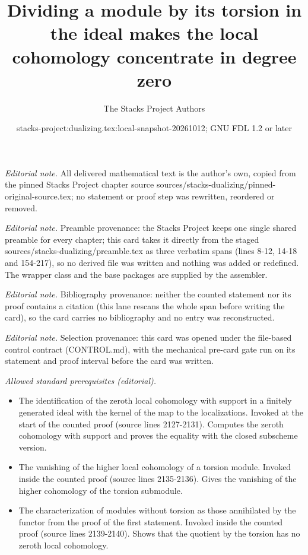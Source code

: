 \documentclass[10pt,a4paper]{amsart}
\title{Dividing a module by its torsion in the ideal makes the local cohomology concentrate in degree zero}
\author{The Stacks Project Authors}
\date{stacks-project:dualizing.tex:local-snapshot-20261012; GNU FDL 1.2 or later}
\theoremstyle{plain}
\theoremstyle{definition}
\theoremstyle{remark}
\numberwithin{equation}{subsection}
\begin{document}
\maketitle
\noindent\textit{Editorial note.} All delivered mathematical text is the author's own, copied from the pinned Stacks Project chapter source sources/stacks-dualizing/pinned-original-source.tex; no statement or proof step was rewritten, reordered or removed.\par\medskip
\noindent\textit{Editorial note.} Preamble provenance: the Stacks Project keeps one single shared preamble for every chapter; this card takes it directly from the staged sources/stacks-dualizing/preamble.tex as three verbatim spans (lines 8-12, 14-18 and 154-217), so no derived file was written and nothing was added or redefined. The wrapper class and the base packages are supplied by the assembler.\par\medskip
\noindent\textit{Editorial note.} Bibliography provenance: neither the counted statement nor its proof contains a citation (this lane rescans the whole span before writing the card), so the card carries no bibliography and no entry was reconstructed.\par\medskip
\noindent\textit{Editorial note.} Selection provenance: this card was opened under the file-based control contract (CONTROL.md), with the mechanical pre-card gate run on its statement and proof interval before the card was written.\par\medskip
\noindent\textit{Allowed standard prerequisites (editorial).}\begin{itemize}
\item The identification of the zeroth local cohomology with support in a finitely generated ideal with the kernel of the map to the localizations. Invoked at the start of the counted proof (source lines 2127-2131). Computes the zeroth cohomology with support and proves the equality with the closed subscheme version.
\item The vanishing of the higher local cohomology of a torsion module. Invoked inside the counted proof (source lines 2135-2136). Gives the vanishing of the higher cohomology of the torsion submodule.
\item The characterization of modules without torsion as those annihilated by the functor from the proof of the first statement. Invoked inside the counted proof (source lines 2139-2140). Shows that the quotient by the torsion has no zeroth local cohomology.
\end{itemize}\medskip
\end{document}
